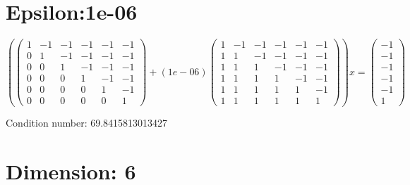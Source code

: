 \documentclass{article}%
\begin{document}
\section{Epsilon:1e{-}06}%
\label{sec:Epsilon1e{-}06}%
\[%
( \begin{pmatrix}%
1&-1&-1&-1&-1&-1\\%
0&1&-1&-1&-1&-1\\%
0&0&1&-1&-1&-1\\%
0&0&0&1&-1&-1\\%
0&0&0&0&1&-1\\%
0&0&0&0&0&1%
\end{pmatrix} + ( 1e{-}06 ) \begin{pmatrix}%
1&-1&-1&-1&-1&-1\\%
1&1&-1&-1&-1&-1\\%
1&1&1&-1&-1&-1\\%
1&1&1&1&-1&-1\\%
1&1&1&1&1&-1\\%
1&1&1&1&1&1%
\end{pmatrix} )x = \begin{pmatrix}%
-1\\%
-1\\%
-1\\%
-1\\%
-1\\%
1%
\end{pmatrix}%
\]%
\begin{Large}%
Condition number:%
69.8415813013427%
\end{Large}

%
\section{Dimension: 6}%
\label{sec:Dimension6}%
\end{document}
